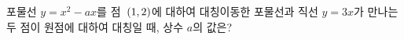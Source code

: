 포물선 $y=x^2-ax$를 점~$(1{,}\mkern3mu\mathopen{}2)$에 대하여 대칭이동한 포물선과 직선 $y=3x$가 만나는 두 점이 원점에 대하여 대칭일 때, 상수 $a$의 값은?
